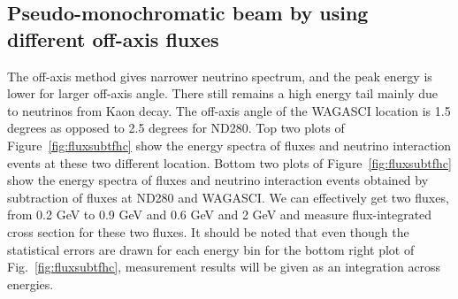 \subsection{Pseudo-monochromatic beam by using different off-axis fluxes}
The off-axis method gives narrower neutrino spectrum, and the peak energy is lower for larger off-axis angle.
There still remains a high energy tail mainly due to neutrinos from Kaon decay.
The off-axis angle of the WAGASCI location is 1.5 degrees as opposed to
2.5 degrees for ND280.
Top two plots of Figure~\ref{fig:fluxsubtfhc} show the energy spectra of fluxes and neutrino interaction events
at these two different location.
Bottom two plots of Figure~\ref{fig:fluxsubtfhc} show the energy spectra of fluxes and neutrino interaction events obtained by subtraction of fluxes at ND280 and WAGASCI.
We can effectively get two fluxes, from 0.2 GeV to 0.9 GeV and 0.6 GeV and 2 GeV
and measure flux-integrated cross section for these two fluxes.
It should be noted that even though the statistical errors are drawn for each energy bin for the bottom right plot of Fig.~\ref{fig:fluxsubtfhc},
measurement results will be given as an integration across energies.

